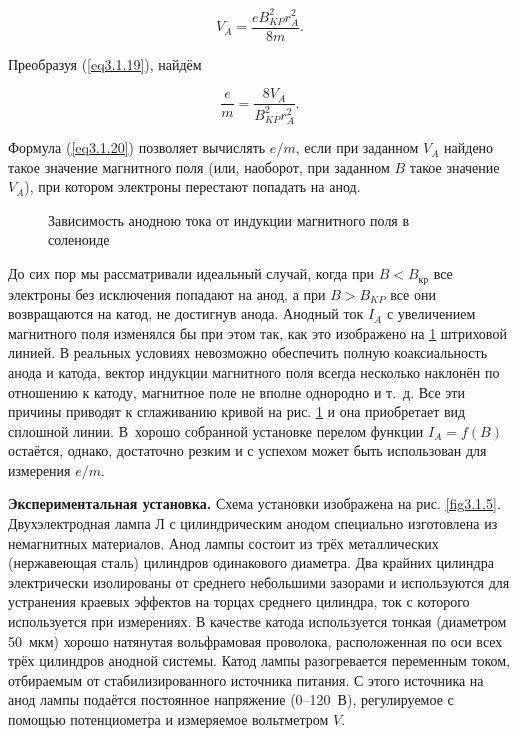 \begin{equation}
V_A=\frac{eB_{KP}^2r_A^2}{8m}.
\label{eq3.1.19}
\end{equation}

Преобразуя (\ref{eq3.1.19}), найдём

\begin{equation}
\frac{e}{m}=\frac{8V_A}{B_{KP}^2r_A^2}.
\label{eq3.1.20}
\end{equation}

Формула (\ref{eq3.1.20}) позволяет вычислять $e/m$, если при заданном $V_A$ найдено такое значение магнитного поля (или, наоборот, при заданном $B$ такое значение $V_A$), при котором электроны перестают попадать на анод.

\begin{figure}
\caption{Зависимость анодною тока от индукции магнитного поля в соленоиде}
\label{fig3.1.4}
\end{figure}

До сих пор мы рассматривали идеальный случай, когда при $B<B_{кр}$ все электроны без исключения попадают на анод, а при $B>B_{KP}$ все они возвращаются на катод, не достигнув анода. Анодный ток $I_A$ с увеличением магнитного поля изменялся бы при этом так, как это изображено на \ref{fig3.1.4} штриховой линией. В реальных условиях невозможно обеспечить полную коаксиальность анода и катода, вектор индукции магнитного поля всегда несколько наклонён по отношению к катоду, магнитное поле не вполне однородно и т.~д. Все эти причины приводят к сглаживанию кривой на рис. \ref{fig3.1.4} и она приобретает вид сплошной линии. В~хорошо собранной установке перелом функции $I_A=f(B)$ остаётся, однако, достаточно резким и с успехом может быть использован для измерения $e/m$.

{\bf Экспериментальная установка.} Схема установки изображена на рис. \ref{fig3.1.5}. Двухэлектродная лампа Л с цилиндрическим анодом специально изготовлена из немагнитных материалов. Анод лампы состоит из трёх металлических (нержавеющая сталь) цилиндров одинакового диаметра. Два крайних цилиндра электрически изолированы от среднего небольшими зазорами и используются для устранения краевых эффектов на торцах среднего цилиндра, ток с которого используется при измерениях. В качестве катода используется тонкая (диаметром 50~мкм) хорошо натянутая вольфрамовая проволока, расположенная по оси всех трёх цилиндров анодной системы.
Катод лампы разогревается переменным током, отбираемым от стабилизированного источника питания. С этого источника на анод лампы подаётся постоянное напряжение (0--120~В), регулируемое с помощью потенциометра и измеряемое вольтметром $V$.

